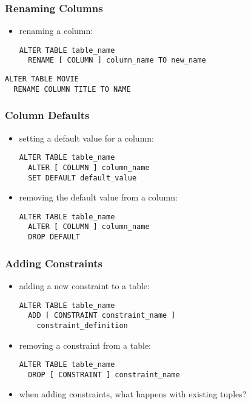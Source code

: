 \documentclass[dvipsnames]{beamer}
\theoremstyle{plain}
\begin{document}
\begin{frame}[fragile]
  \frametitle{Renaming Columns}

  \begin{itemize}
    \item renaming a column:
    \begin{lstlisting}
ALTER TABLE table_name
  RENAME [ COLUMN ] column_name TO new_name
    \end{lstlisting}
  \end{itemize}

  \medskip
  \begin{example}
    \begin{lstlisting}
ALTER TABLE MOVIE
  RENAME COLUMN TITLE TO NAME
    \end{lstlisting}
  \end{example}
\end{frame}

\begin{frame}[fragile]
  \frametitle{Column Defaults}

  \begin{itemize}
    \item setting a default value for a column:
    \begin{lstlisting}
ALTER TABLE table_name
  ALTER [ COLUMN ] column_name
  SET DEFAULT default_value
    \end{lstlisting}

    \item removing the default value from a column:
    \begin{lstlisting}
ALTER TABLE table_name
  ALTER [ COLUMN ] column_name
  DROP DEFAULT
    \end{lstlisting}
  \end{itemize}
\end{frame}

\begin{frame}[fragile]
  \frametitle{Adding Constraints}

  \begin{itemize}
    \item adding a new constraint to a table:
    \begin{lstlisting}
ALTER TABLE table_name
  ADD [ CONSTRAINT constraint_name ]
    constraint_definition
    \end{lstlisting}

   \item removing a constraint from a table:
    \begin{lstlisting}
ALTER TABLE table_name
  DROP [ CONSTRAINT ] constraint_name
    \end{lstlisting}

    \pause
    \item when adding constraints, what happens with existing tuples?
  \end{itemize}
\end{frame}
\end{document}
